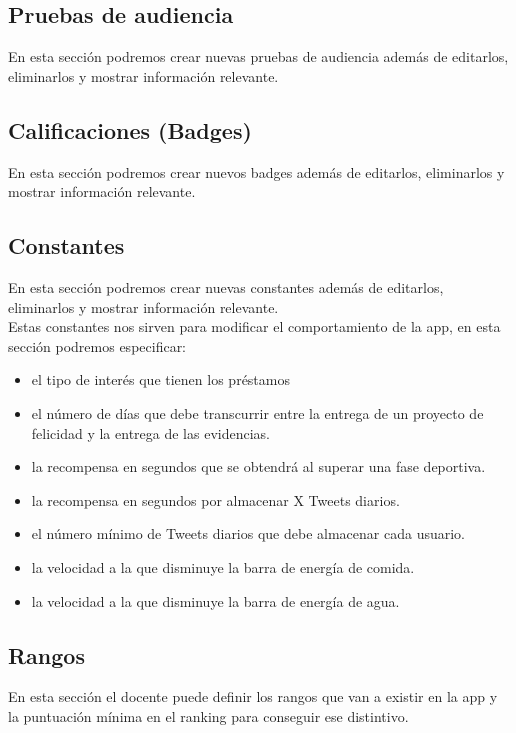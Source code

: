 \subsection{Pruebas de audiencia}
En esta sección podremos crear nuevas pruebas de audiencia además de editarlos, eliminarlos y mostrar información relevante.\\

\subsection{Calificaciones (Badges)}
En esta sección podremos crear nuevos badges además de editarlos, eliminarlos y mostrar información relevante.\\

\subsection{Constantes}
En esta sección podremos crear nuevas constantes además de editarlos, eliminarlos y mostrar información relevante.\\

Estas constantes nos sirven para modificar el comportamiento de la app, en esta sección podremos especificar: 

\begin{itemize}
	\item el tipo de interés que tienen los préstamos
	\item el número de días que debe transcurrir entre la entrega de un proyecto de felicidad y la entrega de las evidencias.
	\item la recompensa en segundos que se obtendrá al superar una fase deportiva.
	\item la recompensa en segundos por almacenar X Tweets diarios.
	\item el número mínimo de Tweets diarios que debe almacenar cada usuario.
	\item la velocidad a la que disminuye la barra de energía de comida.
	\item la velocidad a la que disminuye la barra de energía de agua.
\end{itemize}

\subsection{Rangos}
En esta sección el docente puede definir los rangos que van a existir en la app y la puntuación mínima en el ranking para conseguir ese distintivo.

